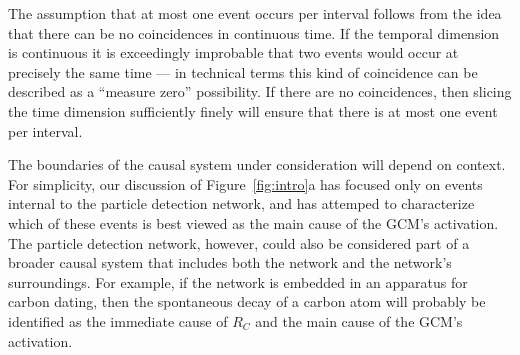 \documentclass[10pt,letterpaper]{article}
\newcommand{\ev}[2]{$#1_#2$}
\begin{document}
The assumption that at most one event occurs per interval follows from the idea that there can be no coincidences in continuous time. If the temporal dimension is continuous it is exceedingly improbable that two events would occur at precisely the same time --- in technical terms this kind of coincidence can be described as a ``measure zero'' possibility. If there are no coincidences, then slicing the time dimension sufficiently finely will ensure that there is at most one event per interval.

The boundaries of the causal system under consideration will depend on context. For simplicity, our discussion of Figure~\ref{fig:intro}a has focused only on events internal to the particle detection network, and has attemped to characterize which of these events is best viewed as the main cause of the GCM's activation. The particle detection network, however, could also be considered part of a broader causal system that includes both the network and the network's surroundings. For example, if the network is embedded in an apparatus for carbon dating, then the spontaneous decay of a carbon atom will probably be identified as the immediate cause of \ev{R}{C} and the main cause of the GCM's activation.


\end{document}
